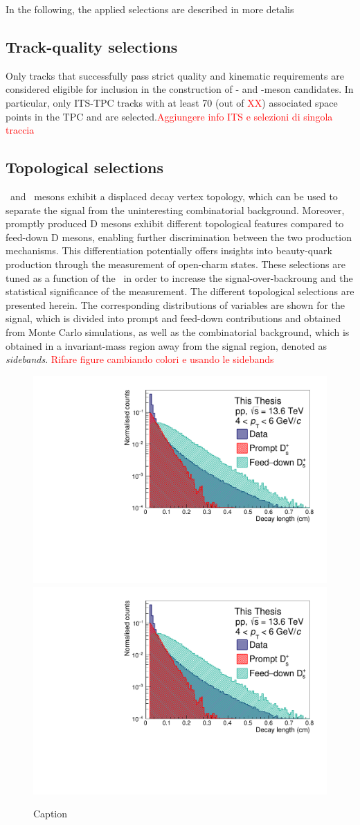 In the following, the applied selections are described in more detalis

\subsection{Track-quality selections}
Only tracks that successfully pass strict quality and kinematic requirements are considered eligible for inclusion in the construction of \ds- and \dpl-meson candidates. In particular, only ITS-TPC tracks with at least 70 (out of \textcolor{red}{XX}) associated space points in the TPC and are selected.\textcolor{red}{Aggiungere info ITS e selezioni di singola traccia}

\subsection{Topological selections}
\ds\ and \dpl\ mesons exhibit a displaced decay vertex topology, which can be used to separate the signal from the uninteresting combinatorial background. Moreover, promptly produced D mesons exhibit different topological features compared to feed-down D mesons, enabling further discrimination between the two production mechanisms. This differentiation potentially offers insights into beauty-quark production through the measurement of open-charm states. These selections are tuned as a function of the \pt\ in order to increase the signal-over-backroung and the statistical significance of the measurement. The different topological selections are presented herein. The corresponding distributions of variables are shown for the signal, which is divided into prompt and feed-down contributions and obtained from Monte Carlo simulations, as well as the combinatorial background, which is obtained in a invariant-mass region away from the signal region, denoted as \emph{sidebands}. \textcolor{red}{Rifare figure cambiando colori e usando le sidebands}

\begin{figure}
    \centering
    \includegraphics[width=0.48\linewidth]{Figures/Chapter 4/DecayLength.pdf}
    \includegraphics[width=0.48\linewidth]{Figures/Chapter 4/DecayLength.pdf}
    \caption{Caption}
    \label{fig:enter-label}
\end{figure}

